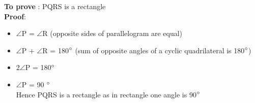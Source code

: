 \begin{frame}
\textbf{To prove} : PQRS is a rectangle\\
\textbf{Proof}: 
\begin{itemize}
\item $\angle$P = $\angle$R (opposite sides of parallelogram are equal)\\
\item $\angle$P + $\angle$R = 180$\degree$ (sum of opposite angles of a cyclic quadrilateral is 180$\degree$)\\

\item 2$\angle$P = 180$\degree$\\
\item$\angle$P = 90 $\degree$\\
Hence PQRS is a rectangle as in rectangle one angle is 90$\degree$\\
\end{itemize}
\end{frame}